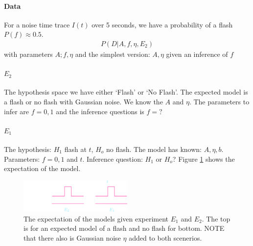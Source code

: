 \documentclass[../main.tex]{subfiles}
\begin{document}
\paragraph*{Data} For a noise time trace $I(t)$ over 5 seconds, we have a probability of a flash
$P(f) \approx  0.5$. 
\begin{align*}
    P(D | A, f, \eta, E_2) 
\end{align*}
with parameters $A; f, \eta$ and the simplest version: $A, \eta$ given an inference of $f$

\paragraph*{$E_2$} The hypothesis space we have either `Flash' or `No Flash'. The expected model is
a flash or no flash with Gaussian noise. We know the $A$
and $\eta$. The parameters to infer are $f = 0, 1$ and the inference questions is $f=?$

\paragraph*{$E_1$} The hypothesis: $H_1$ flash at $t$, $H_o$ no flash. The model has known: $A, \eta, b$.
Parameters: $f=0, 1$ and $t$. Inference question: $H_1$ or $H_o$? Figure \ref{fig:flash2} shows the 
expectation of the model. 

\begin{figure}[ht]
    \centering
    \includegraphics[width=0.5\textwidth]{visionmodel.png}
    \caption{The expectation of the models given experiment $E_1$ and $E_2$. The top is for 
    an expected model of a flash and no flash for bottom. NOTE that there also
    is Gaussian noise $\eta$ added to both scenerios.}
    \label{fig:flash2}
\end{figure}
\end{document}
